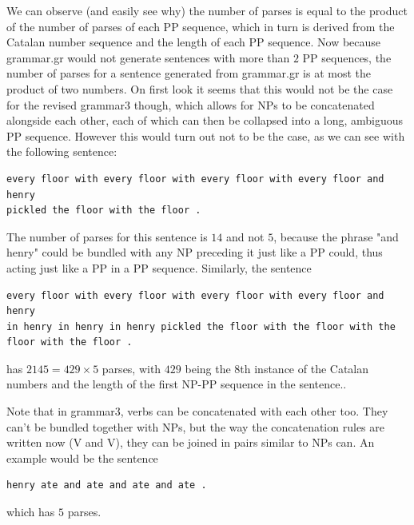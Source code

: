 \documentclass[11pt]{article}
\begin{document}
We can observe (and easily see why) the number of parses is equal to the product of the number of parses of each PP sequence, which in turn is derived from the Catalan number sequence and the length of each PP sequence. Now because grammar.gr would not generate sentences with more than $2$ PP sequences, the number of parses for a sentence generated from grammar.gr is at most the product of two numbers. On first look it seems that this would not be the case for the revised grammar3 though, which allows for NPs to be concatenated alongside each other, each of which can then be collapsed into a long, ambiguous PP sequence. However this would turn out not to be the case, as we can see with the following sentence:

\begin{verbatim}
every floor with every floor with every floor with every floor and henry 
pickled the floor with the floor .
\end{verbatim}

The number of parses for this sentence is $14$ and not $5$, because the phrase "and henry" could be bundled with any NP preceding it just like a PP could, thus acting just like a PP in a PP sequence. Similarly, the sentence 

\begin{verbatim}
every floor with every floor with every floor with every floor and henry 
in henry in henry in henry pickled the floor with the floor with the floor with the floor .
\end{verbatim}

has $2145 = 429 \times 5$ parses, with $429$ being the $8$th instance of the Catalan numbers and the length of the first NP-PP sequence in the sentence..

Note that in grammar3, verbs can be concatenated with each other too. They can't be bundled together with NPs, but the way the concatenation rules are written now (V and V), they can be joined in pairs similar to NPs can. An example would be the sentence 

\begin{verbatim}
henry ate and ate and ate and ate .
\end{verbatim}

which has $5$ parses.

\subsubsection{}
\end{document}
